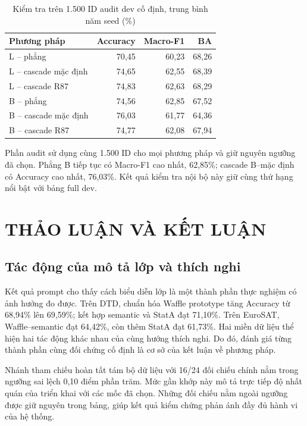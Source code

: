 \documentclass[12pt,a4paper]{article}
\newcommand{\BodySize}{13}
\newcommand{\BodyLeading}{15.6}
\newcommand{\BodyFont}{\fontsize{\BodySize}{\BodyLeading}\selectfont}
\newcommand{\Chapter}[1]{\clearpage\section{#1}}
\numberwithin{figure}{section}
\numberwithin{table}{section}
\numberwithin{equation}{section}
\begin{document}
\begin{table}[H]\centering\BodyFont
\caption{Kiểm tra trên 1.500 ID audit dev cố định, trung bình năm seed (\%)}
\begin{tabularx}{\linewidth}{@{}Lrrr@{}}\toprule
Phương pháp & Accuracy & Macro-F1 & BA\\\midrule
L -- phẳng & 70,45 & 60,23 & 68,26\\
L -- cascade mặc định & 74,65 & 62,55 & 68,39\\
L -- cascade R87 & 74,83 & 62,63 & 68,29\\
B -- phẳng & 74,56 & 62,85 & 67,52\\
B -- cascade mặc định & 76,03 & 61,77 & 64,36\\
B -- cascade R87 & 74,77 & 62,08 & 67,94\\\bottomrule
\end{tabularx}\label{tab:audit-cascade}
\end{table}

Phần audit sử dụng cùng 1.500 ID cho mọi phương pháp và giữ nguyên ngưỡng đã chọn. Phẳng B tiếp tục có Macro-F1 cao nhất, 62,85\%; cascade B--mặc định có Accuracy cao nhất, 76,03\%. Kết quả kiểm tra nội bộ này giữ cùng thứ hạng nổi bật với bảng full dev.

\clearpage



\Chapter{THẢO LUẬN VÀ KẾT LUẬN}
\subsection{Tác động của mô tả lớp và thích nghi}
Kết quả prompt cho thấy cách biểu diễn lớp là một thành phần thực nghiệm có ảnh hưởng đo được. Trên DTD, chuẩn hóa Waffle prototype tăng Accuracy từ 68,94\% lên 69,59\%; kết hợp semantic và StatA đạt 71,10\%. Trên EuroSAT, Waffle--semantic đạt 64,42\%, còn thêm StatA đạt 61,73\%. Hai miền dữ liệu thể hiện hai tác động khác nhau của cùng hướng thích nghi. Do đó, đánh giá từng thành phần cùng đối chứng cố định là cơ sở của kết luận về phương pháp.

Nhánh tham chiếu hoàn tất tám bộ dữ liệu với 16/24 đối chiếu chính nằm trong ngưỡng sai lệch 0,10 điểm phần trăm. Mức gần khớp này mô tả trực tiếp độ nhất quán của triển khai với các mốc đã chọn. Những đối chiếu nằm ngoài ngưỡng được giữ nguyên trong bảng, giúp kết quả kiểm chứng phản ánh đầy đủ hành vi của hệ thống.
\end{document}
